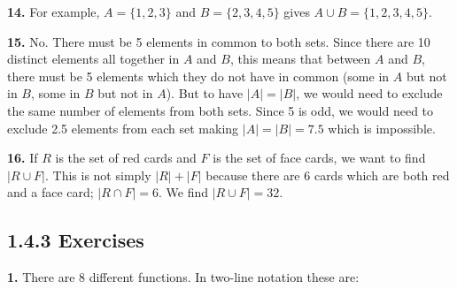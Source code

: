 \documentclass[10pt,]{book}
\theoremstyle{plain}
\theoremstyle{definition}
\theoremstyle{definition}
\theoremstyle{definition}
\numberwithin{equation}{chapter}
\begin{document}
\par\smallskip
\noindent\textbf{14.}\quad{}
          For example, \(A = \{1,2,3\}\) and \(B = \{2,3,4,5\}\) gives \(A\cup B = \{1,2,3,4,5\}\).
\par\smallskip
\noindent\textbf{15.}\quad{}
          No. There must be 5 elements in common to both sets. Since there are 10 distinct elements all together in \(A\) and \(B\), this means that between \(A\) and \(B\), there must be 5 elements which they do not have in common (some in \(A\) but not in \(B\), some in \(B\) but not in \(A\)). But to have \(|A| = |B|\), we would need to exclude the same number of elements from both sets.  Since 5 is odd, we would need to exclude 2.5 elements from each set making \(|A| = |B| = 7.5\) which is impossible.
\par\smallskip
\noindent\textbf{16.}\quad{}
          If \(R\) is the set of red cards and \(F\) is the set of face cards, we want to find \(|R \cup F|\). This is not simply \(|R| + |F|\) because there are 6 cards which are both red and a face card; \(|R \cap F| = 6\). We find
          \(|R \cup F| = 32\).
\par\smallskip
\subsection*{1.4.3 Exercises}
\noindent\textbf{1.}\quad{}
            There are 8 different functions. In two-line notation these are:
\end{document}
